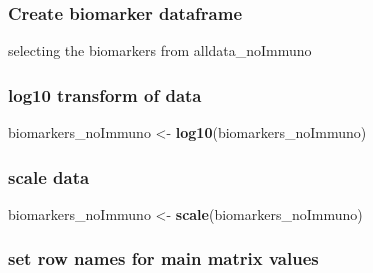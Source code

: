 \documentclass[]{article}
\newenvironment{Shaded}{\begin{snugshade}}{\end{snugshade}}
\newcommand{\KeywordTok}[1]{\textcolor[rgb]{0.13,0.29,0.53}{\textbf{{#1}}}}
\newcommand{\StringTok}[1]{\textcolor[rgb]{0.31,0.60,0.02}{{#1}}}
\newcommand{\CommentTok}[1]{\textcolor[rgb]{0.56,0.35,0.01}{\textit{{#1}}}}
\newcommand{\NormalTok}[1]{{#1}}
\begin{document}
\subsubsection{Create biomarker
dataframe}\label{create-biomarker-dataframe}

selecting the biomarkers from alldata\_noImmuno

\begin{Shaded}
\end{Shaded}

\subsubsection{log10 transform of data}\label{log10-transform-of-data}

\begin{Shaded}
\begin{Highlighting}[]
\NormalTok{biomarkers_noImmuno <-}\StringTok{ }\KeywordTok{log10}\NormalTok{(biomarkers_noImmuno)}
\end{Highlighting}
\end{Shaded}

\subsubsection{scale data}\label{scale-data}

\begin{Shaded}
\begin{Highlighting}[]
\NormalTok{biomarkers_noImmuno <-}\StringTok{ }\KeywordTok{scale}\NormalTok{(biomarkers_noImmuno)}
\end{Highlighting}
\end{Shaded}

\subsubsection{set row names for main matrix
values}\label{set-row-names-for-main-matrix-values}
\end{document}
